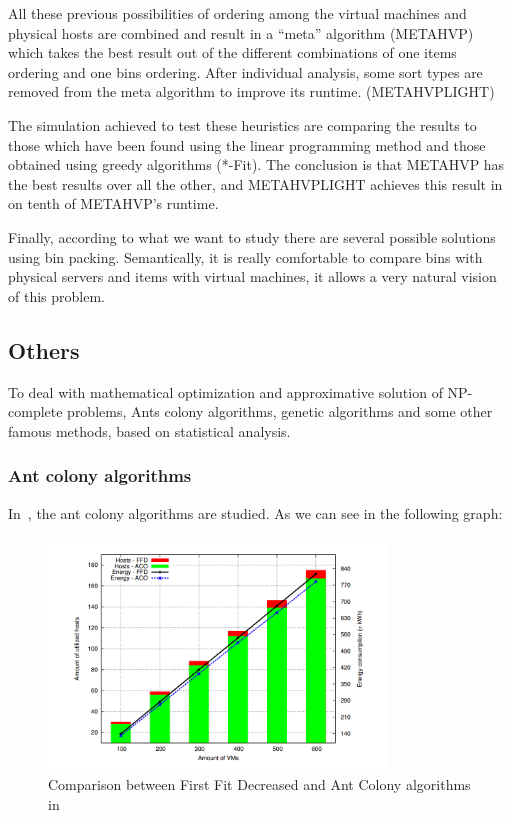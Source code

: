 All these previous possibilities of ordering among the virtual machines and physical
hosts are combined and result in a “meta” algorithm (METAHVP) which takes the best result
out of the different combinations of one items ordering and one bins ordering. After
individual analysis, some sort types are removed from the meta algorithm to improve
its runtime. (METAHVPLIGHT)

The simulation achieved to test these heuristics are comparing the results to those
which have been found using the linear programming method and those obtained using
greedy algorithms (*-Fit). The conclusion is that METAHVP has the best results over
all the other, and METAHVPLIGHT achieves this result in on tenth of METAHVP's runtime.

Finally, according to what we want to study there are several possible solutions using
bin packing. Semantically, it is really comfortable to compare bins with physical servers
and items with virtual machines, it allows a very natural vision of this problem.

\subsection{Others}

To deal with mathematical optimization and approximative solution of NP-complete problems,
Ants colony algorithms, genetic algorithms and some other famous methods, based on statistical
analysis.

\subsubsection{Ant colony algorithms}

In~\cite{algoAntcolony1, algoAntcolony2, algoAntcolony3}, the ant colony
algorithms are studied. As we can see in the following graph:

\begin{figure}[H]
\begin{center}
	\includegraphics[width=0.8\textwidth]{./Images/antcolonyperf.png}
	\caption{Comparison between First Fit Decreased and Ant Colony algorithms in~\cite{algoAntcolony2}}
\end{center}
\end{figure}

